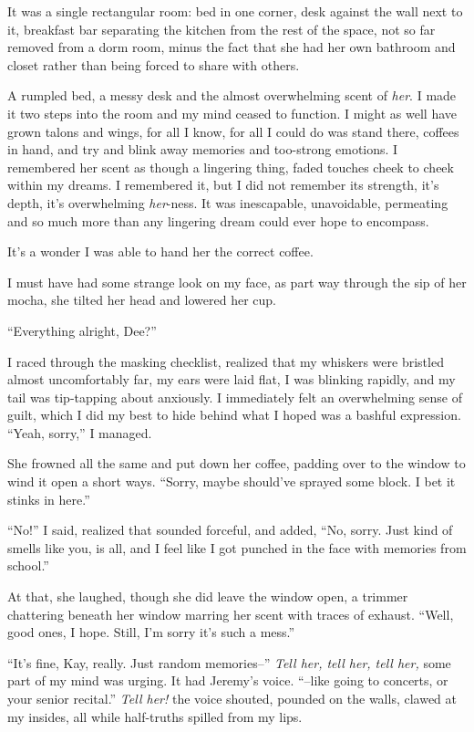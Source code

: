It was a single rectangular room: bed in one corner, desk against the wall next to it, breakfast bar separating the kitchen from the rest of the space, not so far removed from a dorm room, minus the fact that she had her own bathroom and closet rather than being forced to share with others.

A rumpled bed, a messy desk and the almost overwhelming scent of \emph{her}. I made it two steps into the room and my mind ceased to function. I might as well have grown talons and wings, for all I know, for all I could do was stand there, coffees in hand, and try and blink away memories and too-strong emotions. I remembered her scent as though a lingering thing, faded touches cheek to cheek within my dreams. I remembered it, but I did not remember its strength, it's depth, it's overwhelming \emph{her}-ness. It was inescapable, unavoidable, permeating and so much more than any lingering dream could ever hope to encompass.

It's a wonder I was able to hand her the correct coffee.

I must have had some strange look on my face, as part way through the sip of her mocha, she tilted her head and lowered her cup.

``Everything alright, Dee?''

I raced through the masking checklist, realized that my whiskers were bristled almost uncomfortably far, my ears were laid flat, I was blinking rapidly, and my tail was tip-tapping about anxiously. I immediately felt an overwhelming sense of guilt, which I did my best to hide behind what I hoped was a bashful expression. ``Yeah, sorry,'' I managed.

She frowned all the same and put down her coffee, padding over to the window to wind it open a short ways. ``Sorry, maybe should've sprayed some block. I bet it stinks in here.''

``No!'' I said, realized that sounded forceful, and added, ``No, sorry. Just kind of smells like you, is all, and I feel like I got punched in the face with memories from school.''

At that, she laughed, though she did leave the window open, a trimmer chattering beneath her window marring her scent with traces of exhaust. ``Well, good ones, I hope. Still, I'm sorry it's such a mess.''

``It's fine, Kay, really. Just random memories--'' \emph{Tell her, tell her, tell her,} some part of my mind was urging. It had Jeremy's voice. ``--like going to concerts, or your senior recital.'' \emph{Tell her!} the voice shouted, pounded on the walls, clawed at my insides, all while half-truths spilled from my lips.

